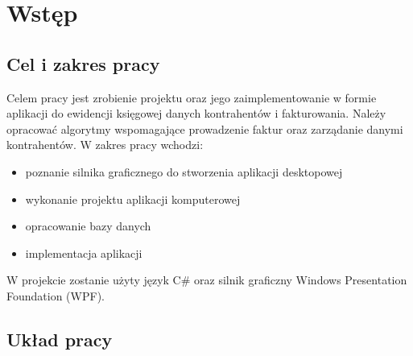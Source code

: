 \chapter{Wstęp}
\section{Cel i zakres pracy}
Celem pracy jest zrobienie projektu oraz jego zaimplementowanie w formie aplikacji do ewidencji księgowej danych kontrahentów i fakturowania. Należy opracować algorytmy wspomagające prowadzenie faktur oraz zarządanie danymi kontrahentów. W zakres pracy wchodzi:
\begin{itemize}
    \item poznanie silnika graficznego do stworzenia aplikacji desktopowej
    \item wykonanie projektu aplikacji komputerowej
    \item opracowanie bazy danych
    \item implementacja aplikacji
\end{itemize}
W projekcie zostanie użyty język C\# oraz silnik graficzny Windows Presentation Foundation (WPF).

\section{Układ pracy}

